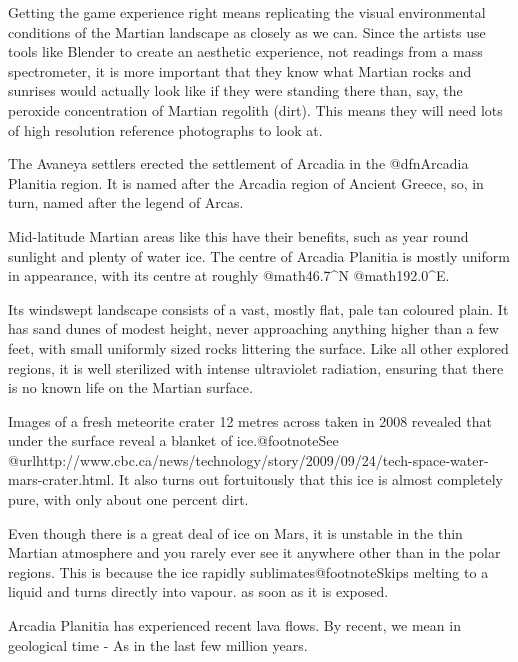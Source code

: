 

Getting the game experience right means replicating the visual environmental conditions of the Martian landscape as closely as we can. Since the artists use tools like Blender to create an aesthetic experience, not readings from a mass spectrometer, it is more important that they know what Martian rocks and sunrises would actually look like if they were standing there than, say, the peroxide concentration of Martian regolith (dirt). This means they will need lots of high resolution reference photographs to look at.

The Avaneya settlers erected the settlement of Arcadia in the @dfn{Arcadia Planitia} region. It is named after the Arcadia region of Ancient Greece, so, in turn, named after the legend of Arcas. 

Mid-latitude Martian areas like this have their benefits, such as year round sunlight and plenty of water ice. The centre of Arcadia Planitia is mostly uniform in appearance, with its centre at roughly @math{46.7^{\circ}}N @math{192.0^{\circ}}E.

Its windswept landscape consists of a vast, mostly flat, pale tan coloured plain. It has sand dunes of modest height, never approaching anything higher than a few feet, with small uniformly sized rocks littering the surface. Like all other explored regions, it is well sterilized with intense ultraviolet radiation, ensuring that there is no known life on the Martian surface.

Images of a fresh meteorite crater 12 metres across taken in 2008 revealed that under the surface reveal a blanket of ice.@footnote{See @url{http://www.cbc.ca/news/technology/story/2009/09/24/tech-space-water-mars-crater.html}.} It also turns out fortuitously that this ice is almost completely pure, with only about one percent dirt.

Even though there is a great deal of ice on Mars, it is unstable in the thin Martian atmosphere and you rarely ever see it anywhere other than in the polar regions. This is because the ice rapidly sublimates@footnote{Skips melting to a liquid and turns directly into vapour.} as soon as it is exposed.

Arcadia Planitia has experienced recent lava flows. By recent, we mean in geological time - As in the last few million years.

